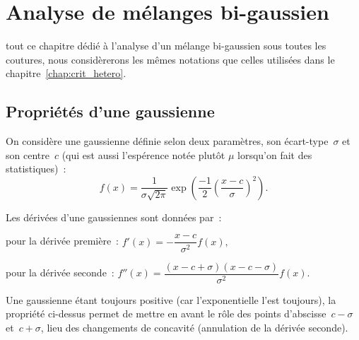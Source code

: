 \documentclass[main.tex]{subfiles}
\begin{document}
\chapter{Analyse de mélanges bi-gaussien \label{chap:anx_gmm}}
 tout ce chapitre dédié à l'analyse d'un mélange bi-gaussien sous toutes les coutures, nous considèrerons les mêmes notations que celles utilisées dans le chapitre~\ref{chap:crit_hetero}.

\section{Propriétés d'une gaussienne}
On considère une gaussienne définie selon deux paramètres, son écart-type~$\sigma$ et son centre~$c$ (qui est aussi l'espérence notée plutôt $\mu$ lorsqu'on fait des statistiques)~:
\begin{equation}
\label{eq:anxe_gaussienne}
f(x)=\dfrac{1}{\sigma \sqrt{2\pi}} \exp\left( \frac{-1}{2}  \left(  \dfrac{x-c}{\sigma} \right)^2  \right).
\end{equation}

\begin{prop}
Les dérivées d'une gaussiennes sont données par~:
\begin{myitemize}
\item pour la dérivée première~: $f'(x)= -\dfrac{x-c}{\sigma^2}f(x), $
\item pour la dérivée seconde~: $f''(x)= \dfrac{(x-c+\sigma)(x-c-\sigma)}{\sigma^2}f(x). $
\end{myitemize}
\end{prop}

Une gaussienne étant toujours positive (car l'exponentielle l'est toujours), la propriété ci-dessus permet de mettre en avant le rôle des points d'abscisse~$c-\sigma$ et~$c+\sigma$, lieu des changements de concavité (annulation de la dérivée seconde).
\end{document}
